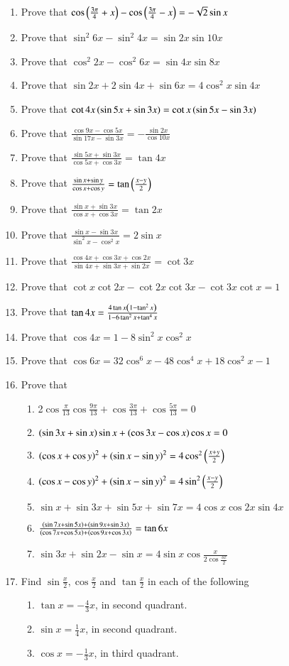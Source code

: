 \begin{enumerate}[label=\thesubsection.\arabic*.,ref=\thesubsection.\theenumi,itemsep=1ex]
%
\item Prove that
$\cos\left(\frac{3\pi}{4}+x\right)-\cos\left(\frac{3\pi}{4}-x\right)=-\sqrt 2\sin x $
%
\item Prove that
$\sin^{2}6x-\sin^{2}4x=\sin2x\sin10x$
%
\item Prove that
$\cos^{2}2x-\cos^{2}6x=\sin4x\sin8x$
%
\item Prove that
$\sin2x+2\sin4x+\sin6x=4\cos^{2}x\sin4x$
%
\item Prove that
$\cot4x\left(\sin5x+\sin3x\right)= \cot x\left(\sin5x-\sin3x\right)$
%
\item Prove that
$\frac{\cos9x-\cos5x}{\sin17x-\sin3x}=-\frac{\sin2x}{\cos10x}$
%
\item Prove that
$\frac{\sin5x+\sin3x}{\cos5x+\cos3x}=\tan4x$
%
\item Prove that
$\frac{\sin x+\sin y}{\cos x+\cos y}=\tan\left(\frac{x-y}{2}\right)$
%
\item Prove that
$\frac{\sin x+\sin3x}{\cos x+\cos3x}=\tan2x$
%
\item Prove that
$\frac{\sin x-\sin3x}{\sin^{2}x-\cos^{2}x}=2\sin x$
%
\item Prove that
$\frac{\cos4x+\cos3x+\cos2x}{\sin4x+\sin3x+\sin2x}=\cot3x$
%
\item Prove that
$\cot x\cot2x-\cot2x\cot3x-\cot3x\cot x=1$
%
\item Prove that
$\tan4x=\frac{4\tan x\left(1-\tan^{2}x\right)}{1-6\tan^{2}x+\tan^{4}x}$
%
\item Prove that
$\cos4x=1-8\sin^{2}x\cos^{2}x$
%
\item Prove that
$\cos6x=32\cos^{6}x-48\cos^{4}x+18\cos^{2}x-1$
%
%
\item Prove that
\begin{enumerate}
\item 2$\cos\frac{\pi}{13}\cos\frac{9\pi}{13}+\cos\frac{3\pi}{13}+\cos\frac{5\pi}{13}=0$
\item $\left(\sin3x+\sin x\right)\sin x+\left(\cos3x-\cos x\right)\cos x=0$
\item $\left(\cos x+\cos y\right)^{2}+\left(\sin x-\sin y\right)^{2}=4\cos^{2}\left(\frac{x+y}{2}\right)$
\item $\left(\cos x-\cos y\right)^{2}+\left(\sin x-\sin y\right)^{2}=4\sin^{2}\left(\frac{x-y}{2}\right)$
\item $\sin x+\sin3x+\sin5x+\sin7x=4\cos x\cos2x\sin4x$
\item $\frac{\left(\sin7x+\sin5x\right)+\left(\sin9x+\sin3x\right)}{\left(\cos7x+\cos5x\right)+\left(\cos9x+\cos3x\right)}=\tan6x$
\item $\sin3x+\sin2x-\sin x=4\sin x\cos\frac{x}{2\cos\frac{3x}{2}}$
\end{enumerate}
%
\item Find $\sin\frac{x}{2},\cos\frac{x}{2}$ and $\tan\frac{x}{2}$ in each of the following
\begin{enumerate}
\item $\tan x=-\frac{4}{3}x$,  in second quadrant. 
\item $\sin x=\frac{1}{4}x$,   in second quadrant.
\item $\cos x=-\frac{1}{3}x$,  in third quadrant.
\end{enumerate}
    
\end{enumerate}
    

